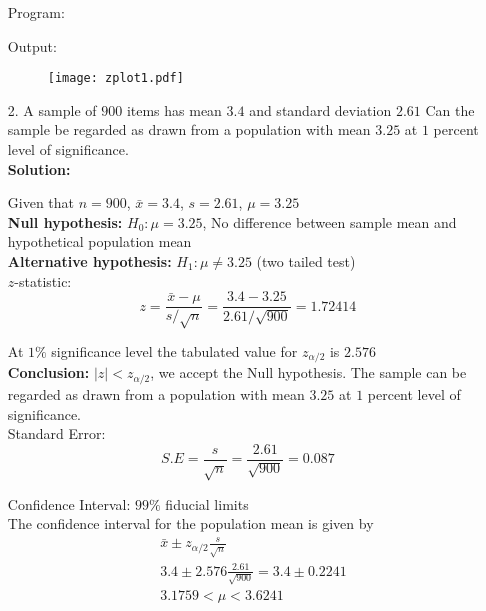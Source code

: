 \documentclass[a4paper,11pt,openright]{report}
\begin{document}
\begin{enumerate}
\vspace{1cm}

Program:


\vspace{1cm}

Output:


\begin{figure}[ht!]
\texttt{[image: zplot1.pdf]}
\centering
\end{figure}

\pagebreak

\item[2.] A sample of $900$ items has mean $3.4$ and standard deviation $2.61$ Can the 
sample be regarded as drawn from a population with mean $3.25$ at $1$ percent level of 
significance. \\

\textbf{Solution:}

Given that $n = 900$, $\bar x = 3.4$, $s = 2.61$, $\mu = 3.25$ \\

\textbf{Null hypothesis:} $H_{0}: \mu = 3.25$, No difference between sample mean and 
hypothetical population mean \\
\textbf{Alternative hypothesis:} $H_{1}: \mu \neq 3.25$ \hspace{5px} (two tailed test) \\

$z$-statistic:
\begin{equation*}
z = \frac{\bar x -\mu}{s/\sqrt{n}} = \frac{3.4 - 3.25}{2.61/\sqrt{900}} = 1.72414
\end{equation*}

At $1\%$ significance level the tabulated value for $z_{\alpha/2}$ is $2.576$ \\

\textbf{Conclusion:} $|z| < z_{\alpha/2}$, we accept the Null hypothesis. The sample can be
regarded as drawn from a population with mean $3.25$ at $1$ percent level of significance.\\

Standard Error:
\begin{equation*}
S.E = \frac{s}{\sqrt{n}} = \frac{2.61}{\sqrt{900}} = 0.087
\end{equation*}

Confidence Interval: $99\%$ fiducial limits \\
The confidence interval for the population mean is given by
\begin{equation*}
\begin{split}
&\bar x \pm z_{\alpha/2} \frac{s}{\sqrt{n}} \\
&3.4 \pm 2.576 \frac{2.61}{\sqrt{900}} = 3.4 \pm 0.2241 \\
&3.1759 < \mu < 3.6241
\end{split}
\end{equation*}


\end{enumerate}
\end{document}
